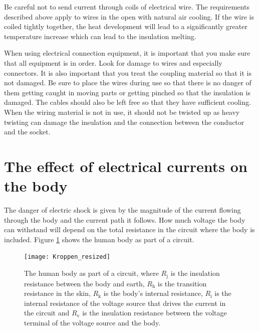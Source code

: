 \documentclass[../Elmag-labhefte-2022.tex]{subfiles}
\begin{document}
Be careful not to send current through coils of electrical wire. The requirements described above apply to wires in the open with natural air cooling. If the wire is coiled tightly together, the heat development will lead to a significantly greater temperature increase which can lead to the insulation melting.

When using electrical connection equipment, it is important that you make sure that all equipment is in order. Look for damage to wires and especially connectors. It is also important that you treat the coupling material so that it is not damaged. Be sure to place the wires during use so that there is no danger of them getting caught in moving parts or getting pinched so that the insulation is damaged. The cables should also be left free so that they have sufficient cooling. When the wiring material is not in use, it should not be twisted up as heavy twisting can damage the insulation and the connection between the conductor and the socket.


\section{The effect of electrical currents on the body}

The danger of electric shock is given by the magnitude of the current flowing through the body and the current path it follows. How much voltage the body can withstand will depend on the total resistance in the circuit where the body is included. Figure \ref{fig:Kroppen} shows the human body as part of a circuit.


\begin{figure}[htbp] 
    \centering
    \texttt{[image: Kroppen\_resized]}
    \caption{
The human body as part of a circuit, where $R_\text{j} $ is the insulation resistance between the body and earth, $R_\text {h} $ is the transition resistance in the skin, $ R_\text {k} $ is the body's internal resistance, $ R_\text {i} $ is the internal resistance of the voltage source that drives the current in the circuit and $ R_\text {v} $ is the insulation resistance between the voltage terminal of the voltage source and the body. 
    }
    \label{fig:Kroppen}
\end{figure}
\end{document}
